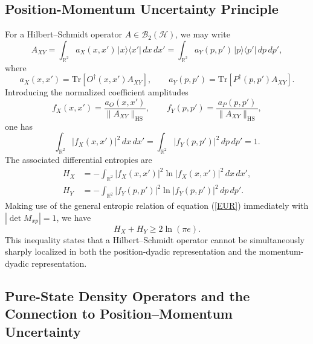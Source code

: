 \documentclass[aps,pra,onecolumn,nofootinbib,superscriptaddress,showpacs]{revtex4}
\begin{document}
\subsection{Position-Momentum Uncertainty Principle}
\noindent For a Hilbert--Schmidt operator $A\in \mathcal B_2(\mathcal H)$,
we may write
\begin{equation}
A_{XY} =
\int_{\mathbb R^2}
a_X(x,x')\, |x\rangle\langle x'|\, dx\,dx'
=
\int_{\mathbb R^2}
a_Y(p,p')\, |p\rangle\langle p'|\, dp\,dp',
\end{equation}
where
\begin{equation}
a_X(x,x') =
\mathrm{Tr}\!\left[O^\dagger(x,x')A_{XY}\right],
\qquad
a_Y(p,p') =
\mathrm{Tr}\!\left[P^\dagger(p,p')A_{XY}\right].
\end{equation}
Introducing the normalized coefficient amplitudes
\begin{equation}
f_X(x,x')=
\frac{a_O(x,x')}{\|A_{XY}\|_{\mathrm{HS}}},
\qquad
f_Y(p,p')=
\frac{a_P(p,p')}{\|A_{XY}\|_{\mathrm{HS}}},
\end{equation}
one has
\begin{equation}
\int_{\mathbb R^2}|f_X(x,x')|^2\,dx\,dx'
=
\int_{\mathbb R^2}|f_Y(p,p')|^2\,dp\,dp'
=1.
\end{equation}
The associated differential entropies are
\begin{align}
H_X
&=
-\int_{\mathbb R^2}
|f_X(x,x')|^2
\ln |f_X(x,x')|^2\,dx\,dx',
\nonumber\\
H_Y
&=
-\int_{\mathbb R^2}
|f_Y(p,p')|^2
\ln |f_Y(p,p')|^2\,dp\,dp'.
\end{align}
Making use of the general entropic relation of equation (\ref{EUR}) immediately with $|\det M_{xp}|=1$, we have
\begin{equation}
H_X+H_Y\geq 2\ln(\pi e).
\end{equation}
This inequality states that a Hilbert--Schmidt operator cannot
be simultaneously sharply localized in both the position-dyadic representation and the momentum-dyadic
representation. 

\subsection{Pure-State Density Operators and the Connection to Position--Momentum Uncertainty}
\end{document}
